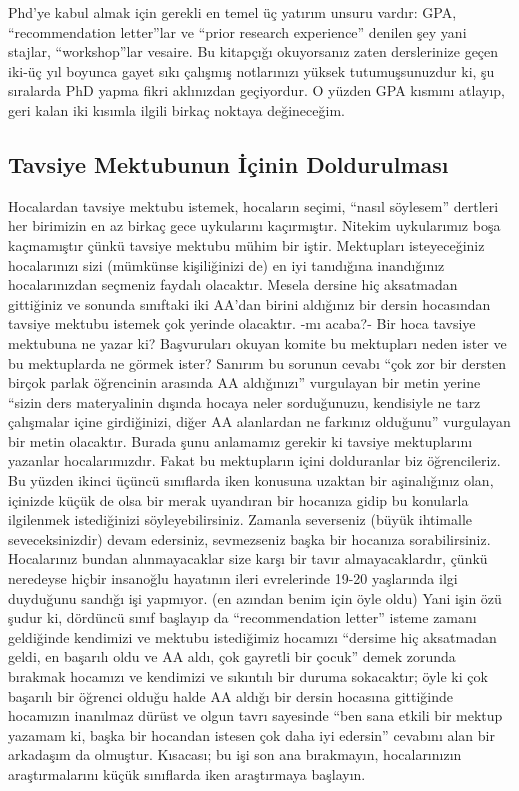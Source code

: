 \documentclass[12pt,a4paper]{article}
\begin{document}
Phd’ye kabul almak için gerekli en temel üç yatırım unsuru vardır: GPA, “recommendation letter”lar ve “prior research experience” denilen şey yani stajlar, “workshop”lar vesaire. Bu kitapçığı okuyorsanız zaten derslerinize geçen iki-üç yıl boyunca gayet sıkı çalışmış notlarınızı yüksek tutumuşsunuzdur ki, şu sıralarda  PhD yapma fikri aklınızdan geçiyordur. O yüzden GPA kısmını atlayıp, geri kalan iki kısımla ilgili birkaç noktaya değineceğim.

\subsection{Tavsiye Mektubunun İçinin Doldurulması}
Hocalardan tavsiye mektubu istemek, hocaların seçimi, “nasıl söylesem” dertleri her birimizin en az birkaç gece uykularını kaçırmıştır. Nitekim uykularımız boşa kaçmamıştır çünkü tavsiye mektubu mühim bir iştir. Mektupları isteyeceğiniz hocalarınızı sizi (mümkünse kişiliğinizi de) en iyi tanıdığına inandığınız hocalarınızdan seçmeniz faydalı olacaktır. Mesela dersine hiç aksatmadan gittiğiniz ve sonunda sınıftaki iki AA’dan birini aldığınız bir dersin hocasından tavsiye mektubu istemek çok yerinde olacaktır. -mı acaba?- Bir hoca tavsiye mektubuna ne yazar ki? Başvuruları okuyan komite bu mektupları neden ister ve bu mektuplarda ne görmek ister? Sanırım bu sorunun cevabı “çok zor bir dersten birçok parlak öğrencinin arasında AA aldığınızı” vurgulayan bir metin yerine “sizin ders materyalinin dışında hocaya neler sorduğunuzu, kendisiyle ne tarz çalışmalar içine girdiğinizi, diğer AA alanlardan ne farkınız olduğunu” vurgulayan bir metin olacaktır. Burada şunu anlamamız gerekir ki tavsiye mektuplarını yazanlar hocalarımızdır. Fakat bu mektupların içini dolduranlar biz öğrencileriz. Bu yüzden ikinci üçüncü sınıflarda iken konusuna uzaktan bir aşinalığınız olan, içinizde küçük de olsa bir merak uyandıran bir hocanıza gidip bu konularla ilgilenmek istediğinizi söyleyebilirsiniz. Zamanla severseniz (büyük ihtimalle seveceksinizdir) devam edersiniz, sevmezseniz başka bir hocanıza sorabilirsiniz. Hocalarınız bundan alınmayacaklar size karşı bir tavır almayacaklardır, çünkü neredeyse hiçbir insanoğlu hayatının ileri evrelerinde 19-20 yaşlarında ilgi duyduğunu sandığı işi yapmıyor. (en azından benim için öyle oldu) Yani işin özü şudur ki, dördüncü sınıf başlayıp da “recommendation letter” isteme zamanı geldiğinde kendimizi ve mektubu istediğimiz hocamızı “dersime hiç aksatmadan geldi, en başarılı oldu ve AA aldı, çok gayretli bir çocuk” demek zorunda bırakmak hocamızı ve kendimizi ve sıkıntılı bir duruma sokacaktır; öyle ki çok başarılı bir öğrenci olduğu halde AA aldığı bir dersin hocasına gittiğinde hocamızın inanılmaz dürüst ve olgun tavrı sayesinde “ben sana etkili bir mektup yazamam ki, başka bir hocandan istesen çok daha iyi edersin” cevabını alan bir arkadaşım da olmuştur. Kısacası; bu işi son ana bırakmayın, hocalarınızın araştırmalarını küçük sınıflarda iken araştırmaya başlayın.
\end{document}
